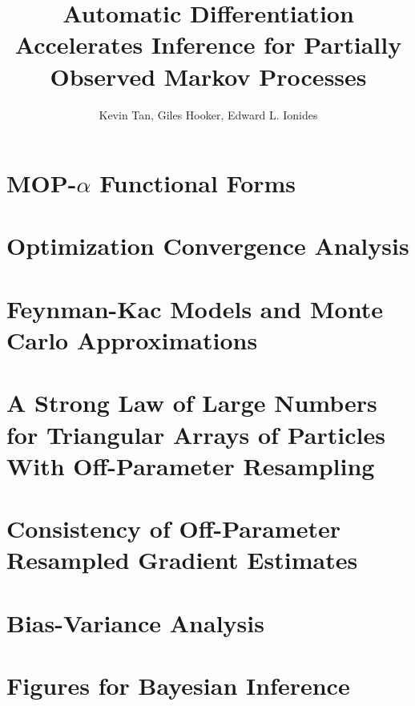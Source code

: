 \documentclass[numsec,webpdf,modern,medium,namedate]{oup-authoring-template}
\begin{document}
\title{Automatic Differentiation Accelerates Inference for Partially Observed Markov Processes}
\author{Kevin Tan, Giles Hooker, Edward L. Ionides}






\maketitle

\SItext




\section{MOP-$\alpha$ Functional Forms}


\label{appendix:functional}



\section{Optimization Convergence Analysis}
\label{appendix:convergence}


\section{Feynman-Kac Models and Monte Carlo Approximations}
\label{appendix:feynman}


\section{A Strong Law of Large Numbers for Triangular Arrays of Particles With Off-Parameter Resampling}
\label{appendix:targeting}



\section{Consistency of Off-Parameter Resampled Gradient Estimates}
\label{appendix:consistency}


\section{Bias-Variance Analysis}
\label{appendix:biasvar}


\section{Figures for Bayesian Inference}
\label{appendix:bayes}




\end{document}
